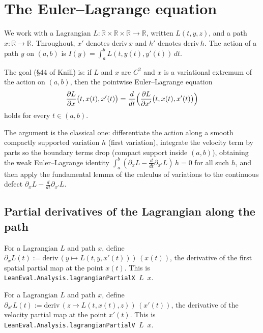 


\section{The Euler--Lagrange equation}

We work with a Lagrangian $L : \mathbb{R} \times \mathbb{R} \times \mathbb{R} \to
\mathbb{R}$, written $L(t, y, z)$, and a path $x : \mathbb{R} \to \mathbb{R}$.
Throughout, $x'$ denotes $\mathrm{deriv}\, x$ and $h'$ denotes
$\mathrm{deriv}\, h$. The action of a path $y$ on $(a,b)$ is
$I(y) = \int_a^b L(t, y(t), y'(t))\, dt$.

The goal (\S44 of Knill) is: if $L$ and $x$ are $C^2$ and $x$ is a variational
extremum of the action on $(a,b)$, then the pointwise Euler--Lagrange equation
\[
  \frac{\partial L}{\partial x}\bigl(t, x(t), x'(t)\bigr)
  = \frac{d}{dt}\Bigl(\frac{\partial L}{\partial x'}\bigl(t, x(t), x'(t)\bigr)\Bigr)
\]
holds for every $t \in (a,b)$.

The argument is the classical one: differentiate the action along a smooth
compactly supported variation $h$ (first variation), integrate the velocity
term by parts so the boundary terms drop (compact support inside $(a,b)$),
obtaining the weak Euler--Lagrange identity $\int_a^b (\partial_x L - \frac{d}{dt}
\partial_{x'} L)\, h = 0$ for all such $h$, and then apply the fundamental lemma
of the calculus of variations to the continuous defect
$\partial_x L - \frac{d}{dt}\partial_{x'} L$.

\subsection{Partial derivatives of the Lagrangian along the path}

\begin{definition}
    \label{def:lagrangian-partial-x}
    \leanok
    For a Lagrangian $L$ and path $x$, define
    $\partial_x L(t) := \mathrm{deriv}\,(y \mapsto L(t, y, x'(t)))\,(x(t))$,
    the derivative of the first spatial partial map at the point $x(t)$. This is
    \texttt{LeanEval.Analysis.lagrangianPartialX $L$ $x$}.
\end{definition}

\begin{definition}
    \label{def:lagrangian-partial-v}
    \leanok
    For a Lagrangian $L$ and path $x$, define
    $\partial_{x'} L(t) := \mathrm{deriv}\,(z \mapsto L(t, x(t), z))\,(x'(t))$,
    the derivative of the velocity partial map at the point $x'(t)$. This is
    \texttt{LeanEval.Analysis.lagrangianPartialV $L$ $x$}.
\end{definition}

